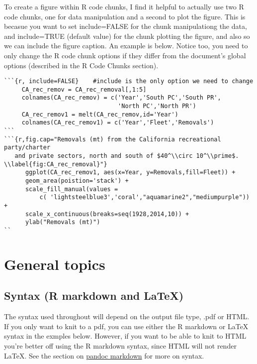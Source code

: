\documentclass[12pt,]{article}
\begin{document}
To create a figure within R code chunks, I find it helpful to actually
use two R code chunks, one for data manipulation and a second to plot
the figure. This is becasue you want to set include=FALSE for the chunk
manipulationg the data, and include=TRUE (default value) for the chunk
plotting the figure, and also so we can include the figure caption. An
example is below. Notice too, you need to only change the R code chunk
options if they differ from the document's global options (described in
the R Code Chunks section).

\begin{Verbatim}[frame=single]
```{r, include=FALSE}    #include is the only option we need to change
     CA_rec_remov = CA_rec_removal[,1:5]
     colnames(CA_rec_remov) = c('Year','South PC','South PR',
                                'North PC','North PR')
     CA_rec_remov1 = melt(CA_rec_remov,id='Year')
     colnames(CA_rec_remov1) = c('Year','Fleet','Removals')
```
```{r,fig.cap="Removals (mt) from the California recreational party/charter 
   and private sectors, north and south of $40^\\circ 10^\\prime$. 
\\label{fig:CA_rec_removal}"}
      ggplot(CA_rec_remov1, aes(x=Year, y=Removals,fill=Fleet)) +
      geom_area(poistion='stack') + 
      scale_fill_manual(values = 
          c( 'lightsteelblue3','coral',"aquamarine2","mediumpurple")) + 
      scale_x_continuous(breaks=seq(1928,2014,10)) + 
      ylab("Removals (mt)")
``
\end{Verbatim}

\section{General topics}\label{general-topics}

\subsection{Syntax (R markdown and
LaTeX)}\label{syntax-r-markdown-and-latex}

The syntax used throughout will depend on the output file type, .pdf or
HTML. If you only want to knit to a pdf, you can use either the R
markdown or LaTeX syntax in the exmples below. However, if you want to
be able to knit to HTML you're better off using the R markdown syntax,
since HTML will not render LaTeX. See the section on
\href{http://rmarkdown.rstudio.com/authoring_pandoc_markdown.html}{pandoc
markdown} for more on syntax.
\end{document}

